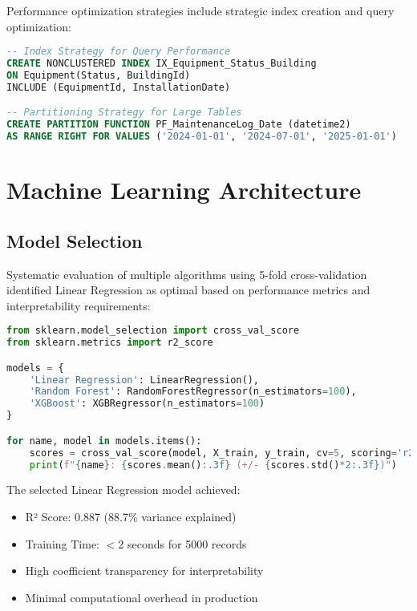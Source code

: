 \documentclass[12pt,a4paper]{report}
\begin{document}
Performance optimization strategies include strategic index creation and query optimization:

\begin{lstlisting}[language=SQL, caption=Database Index Strategy]
-- Index Strategy for Query Performance
CREATE NONCLUSTERED INDEX IX_Equipment_Status_Building 
ON Equipment(Status, BuildingId) 
INCLUDE (EquipmentId, InstallationDate)

-- Partitioning Strategy for Large Tables
CREATE PARTITION FUNCTION PF_MaintenanceLog_Date (datetime2)
AS RANGE RIGHT FOR VALUES ('2024-01-01', '2024-07-01', '2025-01-01')
\end{lstlisting}

\section{Machine Learning Architecture}

\subsection{Model Selection}

Systematic evaluation of multiple algorithms using 5-fold cross-validation identified Linear Regression as optimal based on performance metrics and interpretability requirements:

\begin{lstlisting}[language=Python, caption=Model Evaluation Framework]
from sklearn.model_selection import cross_val_score
from sklearn.metrics import r2_score

models = {
    'Linear Regression': LinearRegression(),
    'Random Forest': RandomForestRegressor(n_estimators=100),
    'XGBoost': XGBRegressor(n_estimators=100)
}

for name, model in models.items():
    scores = cross_val_score(model, X_train, y_train, cv=5, scoring='r2')
    print(f"{name}: {scores.mean():.3f} (+/- {scores.std()*2:.3f})")
\end{lstlisting}

The selected Linear Regression model achieved:
\begin{itemize}
    \item R² Score: 0.887 (88.7\% variance explained)
    \item Training Time: $<$2 seconds for 5000 records
    \item High coefficient transparency for interpretability
    \item Minimal computational overhead in production
\end{itemize}
\end{document}
